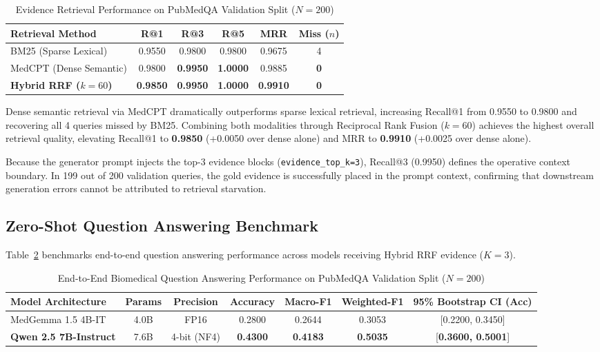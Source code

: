 \documentclass[journal,10pt]{IEEEtran}
\begin{document}
\begin{table}[htbp]
\caption{Evidence Retrieval Performance on PubMedQA Validation Split ($N=200$)}
\label{tab:retrieval}
\centering
\begin{tabular}{lccccc}
\toprule
\textbf{Retrieval Method} & \textbf{R@1} & \textbf{R@3} & \textbf{R@5} & \textbf{MRR} & \textbf{Miss ($n$)} \\
\midrule
BM25 (Sparse Lexical) & 0.9550 & 0.9800 & 0.9800 & 0.9675 & 4 \\
MedCPT (Dense Semantic) & 0.9800 & \textbf{0.9950} & \textbf{1.0000} & 0.9885 & \textbf{0} \\
\textbf{Hybrid RRF ($k=60$)} & \textbf{0.9850} & \textbf{0.9950} & \textbf{1.0000} & \textbf{0.9910} & \textbf{0} \\
\bottomrule
\end{tabular}
\end{table}

Dense semantic retrieval via MedCPT dramatically outperforms sparse lexical retrieval, increasing Recall@1 from 0.9550 to 0.9800 and recovering all 4 queries missed by BM25. Combining both modalities through Reciprocal Rank Fusion ($k=60$) achieves the highest overall retrieval quality, elevating Recall@1 to \textbf{0.9850} (+0.0050 over dense alone) and MRR to \textbf{0.9910} (+0.0025 over dense alone).

Because the generator prompt injects the top-3 evidence blocks (\texttt{evidence\_top\_k=3}), Recall@3 (0.9950) defines the operative context boundary. In 199 out of 200 validation queries, the gold evidence is successfully placed in the prompt context, confirming that downstream generation errors cannot be attributed to retrieval starvation.

\subsection{Zero-Shot Question Answering Benchmark}
Table~\ref{tab:generation} benchmarks end-to-end question answering performance across models receiving Hybrid RRF evidence ($K=3$).

\begin{table}[htbp]
\caption{End-to-End Biomedical Question Answering Performance on PubMedQA Validation Split ($N=200$)}
\label{tab:generation}
\centering
\begin{tabular}{lcccccc}
\toprule
\textbf{Model Architecture} & \textbf{Params} & \textbf{Precision} & \textbf{Accuracy} & \textbf{Macro-F1} & \textbf{Weighted-F1} & \textbf{95\% Bootstrap CI (Acc)} \\
\midrule
MedGemma 1.5 4B-IT & 4.0B & FP16 & 0.2800 & 0.2644 & 0.3053 & [0.2200, 0.3450] \\
\textbf{Qwen 2.5 7B-Instruct} & 7.6B & 4-bit (NF4) & \textbf{0.4300} & \textbf{0.4183} & \textbf{0.5035} & [\textbf{0.3600, 0.5001}] \\
\bottomrule
\end{tabular}
\end{table}
\end{document}
